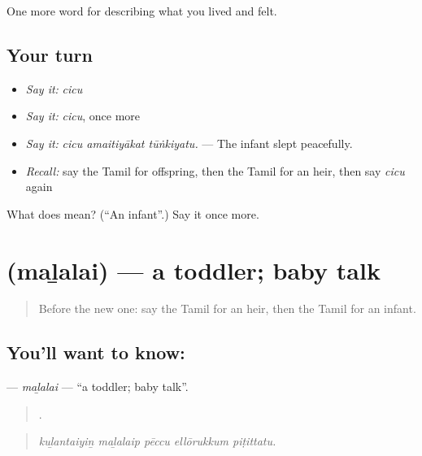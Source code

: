 \begin{grammarlens}[title={What you've built}]
One more word for describing what you lived and felt.
\end{grammarlens}

\subsection*{Your turn}
\begin{itemize}
\raggedright
  \item \emph{Say it:} \emph{cicu}
  \item \emph{Say it:} \emph{cicu}, once more
  \item \emph{Say it:} \emph{cicu amaitiyākat tūṅkiyatu.} — The infant slept peacefully.
  \item \emph{Recall:} say the Tamil for offspring, then the Tamil for an heir, then say \emph{cicu} again
\end{itemize}

\begin{tcolorbox}[breakable,colback=teal!4,colframe=teal!35!black,title={Before you move on}]
What does  mean? (\textquotedblleft{}An infant\textquotedblright{}.) Say it once more.
\end{tcolorbox}
\section[\texorpdfstring{\ta{மழலை} (maḻalai)}{மழலை (maḻalai)}]{ (maḻalai) — a toddler; baby talk}

\label{lesson:TA-C495-malalai}



\begin{quote}
Before the new one: say the Tamil for an heir, then the Tamil for an infant.
\end{quote}

\subsection*{You'll want to know: }
\textbf{} — \emph{maḻalai} — \textquotedblleft{}a toddler; baby talk\textquotedblright{}.

\begin{quote}
    .
\end{quote}

\begin{quote}
\emph{kuḻantaiyiṉ maḻalaip pēccu ellōrukkum piṭittatu.}
\end{quote}

